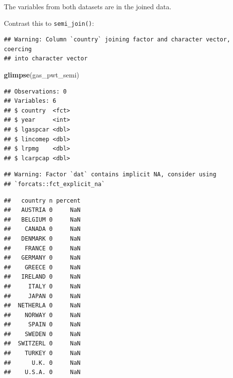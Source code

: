 \documentclass[]{gitbook}
\newenvironment{Shaded}{\begin{snugshade}}{\end{snugshade}}
\newcommand{\DataTypeTok}[1]{\textcolor[rgb]{0.13,0.29,0.53}{#1}}
\newcommand{\KeywordTok}[1]{\textcolor[rgb]{0.13,0.29,0.53}{\textbf{#1}}}
\newcommand{\NormalTok}[1]{#1}
\newcommand{\OperatorTok}[1]{\textcolor[rgb]{0.81,0.36,0.00}{\textbf{#1}}}
\newcommand{\StringTok}[1]{\textcolor[rgb]{0.31,0.60,0.02}{#1}}
\begin{document}
The variables from both datasets are in the joined data.

Contrast this to \texttt{semi\_join()}:

\begin{Shaded}
\end{Shaded}

\begin{verbatim}
## Warning: Column `country` joining factor and character vector, coercing
## into character vector
\end{verbatim}

\begin{Shaded}
\begin{Highlighting}[]
\KeywordTok{glimpse}\NormalTok{(gas_pwt_semi)}
\end{Highlighting}
\end{Shaded}

\begin{verbatim}
## Observations: 0
## Variables: 6
## $ country  <fct> 
## $ year     <int> 
## $ lgaspcar <dbl> 
## $ lincomep <dbl> 
## $ lrpmg    <dbl> 
## $ lcarpcap <dbl>
\end{verbatim}

\begin{Shaded}
\end{Shaded}

\begin{verbatim}
## Warning: Factor `dat` contains implicit NA, consider using
## `forcats::fct_explicit_na`
\end{verbatim}

\begin{verbatim}
##   country n percent
##   AUSTRIA 0     NaN
##   BELGIUM 0     NaN
##    CANADA 0     NaN
##   DENMARK 0     NaN
##    FRANCE 0     NaN
##   GERMANY 0     NaN
##    GREECE 0     NaN
##   IRELAND 0     NaN
##     ITALY 0     NaN
##     JAPAN 0     NaN
##  NETHERLA 0     NaN
##    NORWAY 0     NaN
##     SPAIN 0     NaN
##    SWEDEN 0     NaN
##  SWITZERL 0     NaN
##    TURKEY 0     NaN
##      U.K. 0     NaN
##    U.S.A. 0     NaN
\end{verbatim}
\end{document}
